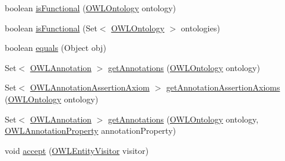 \begin{DoxyCompactItemize}
\item 
boolean \hyperlink{classuk_1_1ac_1_1manchester_1_1cs_1_1owl_1_1owlapi_1_1_o_w_l_data_property_impl_aa14a3fa7eee2b7bc6dca537f75cb466b}{is\-Functional} (\hyperlink{interfaceorg_1_1semanticweb_1_1owlapi_1_1model_1_1_o_w_l_ontology}{O\-W\-L\-Ontology} ontology)
\item 
boolean \hyperlink{classuk_1_1ac_1_1manchester_1_1cs_1_1owl_1_1owlapi_1_1_o_w_l_data_property_impl_a2c11dae4788b446075027a57f44ca86b}{is\-Functional} (Set$<$ \hyperlink{interfaceorg_1_1semanticweb_1_1owlapi_1_1model_1_1_o_w_l_ontology}{O\-W\-L\-Ontology} $>$ ontologies)
\item 
boolean \hyperlink{classuk_1_1ac_1_1manchester_1_1cs_1_1owl_1_1owlapi_1_1_o_w_l_data_property_impl_a0762c9df9ae30ef56fc5ce358a424404}{equals} (Object obj)
\item 
Set$<$ \hyperlink{interfaceorg_1_1semanticweb_1_1owlapi_1_1model_1_1_o_w_l_annotation}{O\-W\-L\-Annotation} $>$ \hyperlink{classuk_1_1ac_1_1manchester_1_1cs_1_1owl_1_1owlapi_1_1_o_w_l_data_property_impl_a448c6553933b5e3a1d1c4da76983fac3}{get\-Annotations} (\hyperlink{interfaceorg_1_1semanticweb_1_1owlapi_1_1model_1_1_o_w_l_ontology}{O\-W\-L\-Ontology} ontology)
\item 
Set$<$ \hyperlink{interfaceorg_1_1semanticweb_1_1owlapi_1_1model_1_1_o_w_l_annotation_assertion_axiom}{O\-W\-L\-Annotation\-Assertion\-Axiom} $>$ \hyperlink{classuk_1_1ac_1_1manchester_1_1cs_1_1owl_1_1owlapi_1_1_o_w_l_data_property_impl_aa5e679435ad4bd8ed84db58eef2b6e4e}{get\-Annotation\-Assertion\-Axioms} (\hyperlink{interfaceorg_1_1semanticweb_1_1owlapi_1_1model_1_1_o_w_l_ontology}{O\-W\-L\-Ontology} ontology)
\item 
Set$<$ \hyperlink{interfaceorg_1_1semanticweb_1_1owlapi_1_1model_1_1_o_w_l_annotation}{O\-W\-L\-Annotation} $>$ \hyperlink{classuk_1_1ac_1_1manchester_1_1cs_1_1owl_1_1owlapi_1_1_o_w_l_data_property_impl_aa4cd2158d5addbab9a773817e931fb5e}{get\-Annotations} (\hyperlink{interfaceorg_1_1semanticweb_1_1owlapi_1_1model_1_1_o_w_l_ontology}{O\-W\-L\-Ontology} ontology, \hyperlink{interfaceorg_1_1semanticweb_1_1owlapi_1_1model_1_1_o_w_l_annotation_property}{O\-W\-L\-Annotation\-Property} annotation\-Property)
\item 
void \hyperlink{classuk_1_1ac_1_1manchester_1_1cs_1_1owl_1_1owlapi_1_1_o_w_l_data_property_impl_a5cdd3f5c0999fd6a06662d91daff3a23}{accept} (\hyperlink{interfaceorg_1_1semanticweb_1_1owlapi_1_1model_1_1_o_w_l_entity_visitor}{O\-W\-L\-Entity\-Visitor} visitor)
\item 

\end{DoxyCompactItemize}
